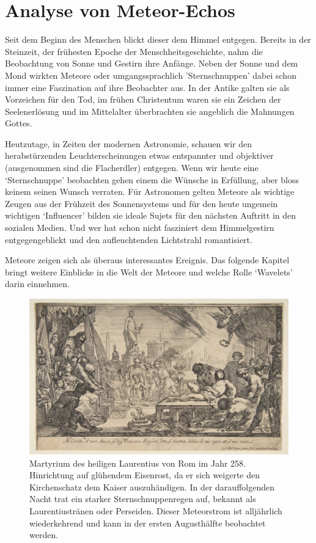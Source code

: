 %
%
%
\chapter{Analyse von Meteor-Echos\label{chapter:meteor}}
\begin{refsection}

Seit dem Beginn des Menschen blickt dieser dem Himmel entgegen.
Bereits in der Steinzeit, der frühesten Epoche der Menschheitsgeschichte, nahm die Beobachtung von Sonne und Gestirn ihre Anfänge.
Neben der Sonne und dem Mond wirkten Meteore oder umgangssprachlich 'Sternschnuppen' dabei schon immer eine Faszination auf ihre Beobachter aus.
In der Antike galten sie als Vorzeichen für den Tod, im frühen Christentum waren sie ein Zeichen der Seelenerlösung und im Mittelalter überbrachten sie angeblich die Mahnungen Gottes.

Heutzutage, in Zeiten der modernen Astronomie, schauen wir den herabstürzenden Leuchterscheinungen etwas entspannter und objektiver (ausgenommen sind die Flacherdler) entgegen.
Wenn wir heute eine `Sternschnuppe' beobachten gehen einem die Wünsche in Erfüllung, aber bloss keinem seinen Wunsch verraten.
Für Astronomen gelten Meteore als wichtige Zeugen aus der Frühzeit des Sonnensystems und für den heute ungemein wichtigen `Influencer' bilden sie ideale Sujets für den nächsten Auftritt in den sozialen Medien.
Und wer hat schon nicht fasziniert dem Himmelgestirn entgegengeblickt und den aufleuchtenden Lichtstrahl romantisiert.

Meteore zeigen sich als überaus interessantes Ereignis.
Das folgende Kapitel bringt weitere Einblicke in die Welt der Meteore und welche Rolle `Wavelets' darin einnehmen.
\begin{figure}
	\centering
	\includegraphics[width=0.7\linewidth]{papers/meteor/images/claudeVignonMartyriumDesHeiligenLaurentius}
	\caption{Martyrium des heiligen Laurentius von Rom im Jahr 258. 
		Hinrichtung auf glühendem Eisenrost, da er sich weigerte den Kirchenschatz dem Kaiser auszuhändigen.\cite{buch:joeckle}
		In der darauffolgenden Nacht trat ein starker Sternschnuppenregen auf, bekannt als Laurentiustränen oder Perseiden. 
		Dieser Meteorstrom ist alljährlich wiederkehrend und kann in der ersten Augusthälfte beobachtet werden.\cite{gemaelde:vignon}}
	\label{fig:claudevignonmartyriumdesheiligenlaurentius}
\end{figure}


\end{refsection}
